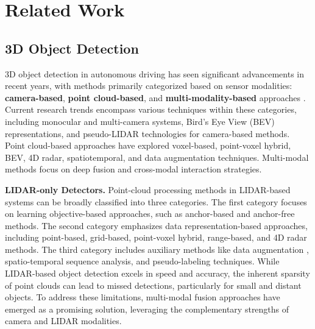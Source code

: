 \section{Related Work}
\label{sec: related work}

\subsection{3D Object Detection}

3D object detection in autonomous driving has seen significant advancements in recent years, with methods primarily categorized based on sensor modalities: \textbf{camera-based}, \textbf{point cloud-based}, and \textbf{multi-modality-based} approaches \cite{3dodsurvey2022}. Current research trends encompass various techniques within these categories, including monocular and multi-camera systems, Bird's Eye View (BEV) representations, and pseudo-LIDAR technologies for camera-based methods. Point cloud-based approaches have explored voxel-based, point-voxel hybrid, BEV, 4D radar, spatiotemporal, and data augmentation techniques. Multi-modal methods focus on deep fusion and cross-modal interaction strategies.

\noindent
\textbf{LIDAR-only Detectors.}
Point-cloud processing methods in LIDAR-based systems can be broadly classified into three categories. The first category focuses on learning objective-based approaches, such as anchor-based \cite{UTsemi2022} and anchor-free \cite{Afdet2020} methods. The second category emphasizes data representation-based approaches, including point-based, grid-based, point-voxel hybrid, range-based, and 4D radar methods. The third category includes auxiliary methods like data augmentation \cite{Qdataaug2020}, spatio-temporal sequence analysis, and pseudo-labeling techniques. While LIDAR-based object detection excels in speed and accuracy, the inherent sparsity of point clouds can lead to missed detections, particularly for small and distant objects. To address these limitations, multi-modal fusion approaches have emerged as a promising solution, leveraging the complementary strengths of camera and LIDAR modalities.

